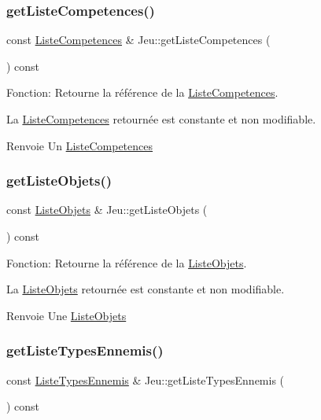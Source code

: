 \subsubsection{\texorpdfstring{get\+Liste\+Competences()}{getListeCompetences()}}
{\footnotesize\ttfamily const \mbox{\hyperlink{structListeCompetences}{Liste\+Competences}} \& Jeu\+::get\+Liste\+Competences (\begin{DoxyParamCaption}{ }\end{DoxyParamCaption}) const}



Fonction\+: Retourne la référence de la \mbox{\hyperlink{structListeCompetences}{Liste\+Competences}}. 

La \mbox{\hyperlink{structListeCompetences}{Liste\+Competences}} retournée est constante et non modifiable. \begin{DoxyReturn}{Renvoie}
Un \mbox{\hyperlink{structListeCompetences}{Liste\+Competences}} 
\end{DoxyReturn}
\mbox{\label{classJeu_a11834724f2c7851c06aa9896529b8aa2}} 
\subsubsection{\texorpdfstring{get\+Liste\+Objets()}{getListeObjets()}}
{\footnotesize\ttfamily const \mbox{\hyperlink{structListeObjets}{Liste\+Objets}} \& Jeu\+::get\+Liste\+Objets (\begin{DoxyParamCaption}{ }\end{DoxyParamCaption}) const}



Fonction\+: Retourne la référence de la \mbox{\hyperlink{structListeObjets}{Liste\+Objets}}. 

La \mbox{\hyperlink{structListeObjets}{Liste\+Objets}} retournée est constante et non modifiable. \begin{DoxyReturn}{Renvoie}
Une \mbox{\hyperlink{structListeObjets}{Liste\+Objets}} 
\end{DoxyReturn}
\mbox{\label{classJeu_ab7033079ca4b29a4673da3a799626a0a}} 
\subsubsection{\texorpdfstring{get\+Liste\+Types\+Ennemis()}{getListeTypesEnnemis()}}
{\footnotesize\ttfamily const \mbox{\hyperlink{structListeTypesEnnemis}{Liste\+Types\+Ennemis}} \& Jeu\+::get\+Liste\+Types\+Ennemis (\begin{DoxyParamCaption}{ }\end{DoxyParamCaption}) const}



